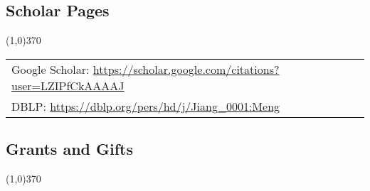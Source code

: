 \documentclass[10pt]{article}
\begin{document}
\vspace{-0.6cm}
\subsection{\sc Scholar Pages}
\vspace{-0.4cm} \line(1,0){370} \vspace{-0.1cm}

\begin{table}[h!]
\begin{tabular*}{12.7cm}{p{11.65cm}r}
\multicolumn{2}{l}{Google Scholar: \url{https://scholar.google.com/citations?user=LZIPfCkAAAAJ}} \\
\multicolumn{2}{l}{DBLP: \url{https://dblp.org/pers/hd/j/Jiang\_0001:Meng}} \\
\end{tabular*}
\end{table}

\subsection{\sc Grants and Gifts}
\vspace{-0.4cm} \line(1,0){370} \vspace{-0.1cm}
\end{document}
